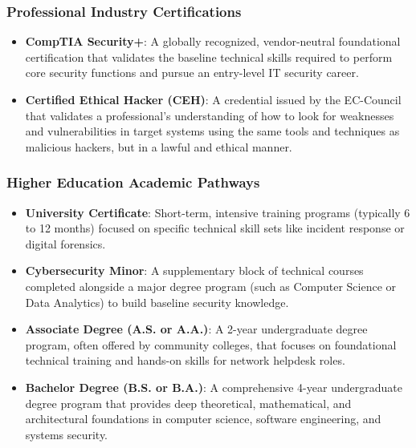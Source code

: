 \documentclass[12pt,openany]{book}
\begin{document}
\subsubsection*{Professional Industry Certifications}


\begin{itemize}

  \item \textbf{CompTIA Security+}: A globally recognized, vendor-neutral foundational certification that validates the baseline technical skills required to perform core security functions and pursue an entry-level IT security career.

  \item \textbf{Certified Ethical Hacker (CEH)}: A credential issued by the EC-Council that validates a professional's understanding of how to look for weaknesses and vulnerabilities in target systems using the same tools and techniques as malicious hackers, but in a lawful and ethical manner.

\end{itemize}


\subsubsection*{Higher Education Academic Pathways}


\begin{itemize}

  \item \textbf{University Certificate}: Short-term, intensive training programs (typically 6 to 12 months) focused on specific technical skill sets like incident response or digital forensics.

  \item \textbf{Cybersecurity Minor}: A supplementary block of technical courses completed alongside a major degree program (such as Computer Science or Data Analytics) to build baseline security knowledge.

  \item \textbf{Associate Degree (A.S. or A.A.)}: A 2-year undergraduate degree program, often offered by community colleges, that focuses on foundational technical training and hands-on skills for network helpdesk roles.

  \item \textbf{Bachelor Degree (B.S. or B.A.)}: A comprehensive 4-year undergraduate degree program that provides deep theoretical, mathematical, and architectural foundations in computer science, software engineering, and systems security.

\end{itemize}
\end{document}
